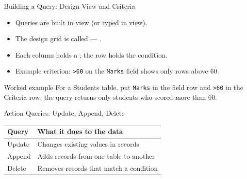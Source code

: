 \documentclass[aspectratio=169]{beamer}
\begin{document}
\begin{frame}{Building a Query: Design View and Criteria}
  \begin{itemize}
    \item Queries are built in  view (or typed in
       view).
    \item The design grid is called  --- .
    \item Each column holds a ; the  row holds the
      condition.
    \item Example criterion: \texttt{>60} on the \texttt{Marks} field shows
      only rows above 60.
  \end{itemize}
  \begin{exampleblock}{Worked example}
    For a Students table, put \texttt{Marks} in the field row and
    \texttt{>60} in the Criteria row; the query returns only students who
    scored more than 60.
  \end{exampleblock}
\end{frame}

\begin{frame}{Action Queries: Update, Append, Delete}
  \begin{center}
    \begin{tabular}{p{}p{}}
      \toprule
      \textbf{Query} & \textbf{What it does to the data} \\
      \midrule
      Update & Changes existing values in records \\
      Append & Adds records from one table to another \\
      Delete & Removes records that match a condition \\
      \bottomrule
    \end{tabular}
  \end{center}
  \vspace{0.2cm}
\end{frame}
\end{document}
